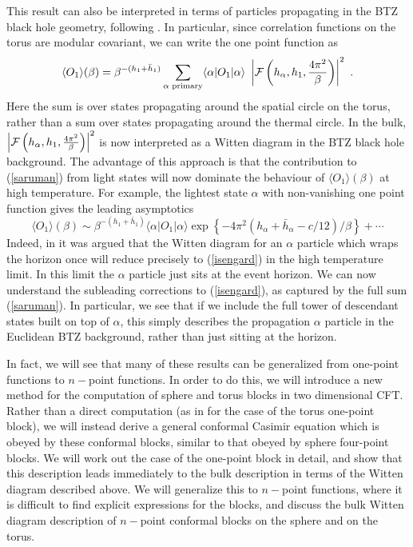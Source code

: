 \documentclass[12pt]{article}
\newcommand\rref[1]{(\ref{#1})}
\begin{document}
 This result can also be interpreted in terms of particles propagating in the BTZ black hole geometry, following \cite{Kraus:2016nwo}.  In particular, since correlation functions on the torus are modular covariant, we can write the one point function as
\begin{equation}\label{saruman}
\langle O_1 \rangle (\beta) =
\beta^{-(h_1 + {\bar h}_1)}
\sum_{\alpha \text{ primary}} \langle \alpha | O_1 | \alpha \rangle~
\left |\mathcal{F}\left(h_\alpha, h_1, {4\pi^2 \over \beta}\right)\right|^2~.
\end{equation}
Here the sum is over states propagating around the spatial circle on the torus, rather than a sum over states propagating around the thermal circle.  In the bulk, $\left|\mathcal{F}\left(h_\alpha, h_1, {4\pi^2 \over \beta}\right)\right|^2$ is now interpreted as a Witten diagram in the BTZ black hole background.
The advantage of this approach is that the contribution to \rref{saruman} from light states will now dominate the behaviour of $\langle O_1\rangle(\beta)$ at high temperature.
For example, the lightest state $\alpha$ with non-vanishing one point function gives the leading asymptotics
\begin{equation}\label{isengard}
\langle O_1\rangle(\beta) \sim \beta^{-(h_1 + {\bar h}_1)}
\langle \alpha | O_1 | \alpha\rangle
\exp\left\{-4\pi^2 (h_{\alpha} + {\bar h}_\alpha-c/12)/\beta\right\}+\cdots
\end{equation}
Indeed, in \cite{Kraus:2016nwo} it was argued that the Witten diagram for an $\alpha$ particle which wraps the horizon once will reduce precisely to \rref{isengard} in the high temperature limit.  In this limit the $\alpha$ particle just sits at the event horizon.
We can now understand the subleading corrections to \rref{isengard}, as captured by the full sum \rref{saruman}.  In particular, we see that if we include the full tower of descendant states built on top of $\alpha$, this simply describes the propagation $\alpha$ particle in the Euclidean BTZ background, rather than just sitting at the horizon.

In fact, we will see that many of these results can be generalized from one-point functions to $n-$point functions.  In order to do this, we will introduce a new method for the computation of sphere and torus blocks in two dimensional CFT.  Rather than a direct computation (as in \cite{Hadasz:2009db} for the case of the torus one-point block), we will instead derive a general conformal Casimir equation which is obeyed by these conformal blocks, similar to that obeyed by sphere four-point blocks.  We will work out the case of the one-point block in detail, and show that this description leads immediately to the bulk description in terms of the Witten diagram described above.  We will generalize this to $n-$point functions, where it is difficult to find explicit expressions for the blocks, and discuss the bulk Witten diagram description of $n-$point conformal blocks on the sphere and on the torus.
\end{document}

